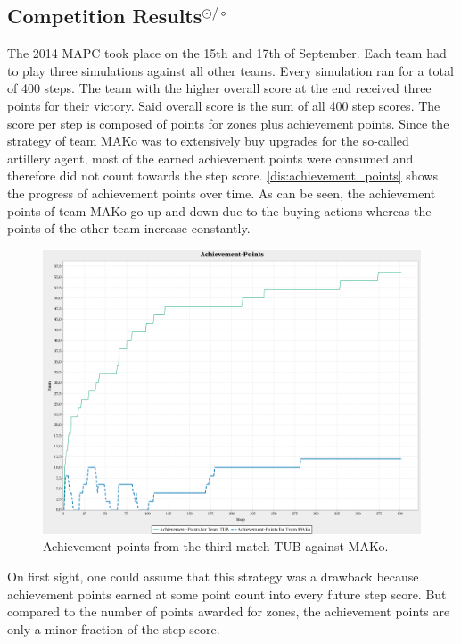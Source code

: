 \subsection[Competition Results]{Competition Results$^{\odot/\circ}$}
The 2014 MAPC took place on the 15th and 17th of September.
Each team had to play three simulations against all other teams.
Every simulation ran for a total of 400 steps.
The team with the higher overall score at the end received three points for their victory.
Said overall score is the sum of all 400 step scores.
The score per step is composed of points for zones plus achievement points.
Since the strategy of team MAKo was to extensively buy upgrades for the so-called artillery agent, most of the earned achievement points were consumed and therefore did not count towards the step score.
\autoref{dis:achievement_points} shows the progress of achievement points over time.
As can be seen, the achievement points of team MAKo go up and down due to the buying actions whereas the points of the other team increase constantly.
\begin{figure}[ht]
	\centering
	\includegraphics[width=\textwidth]{images/AchievementPoints.png}
  \caption{Achievement points from the third match TUB against MAKo.}
	\label{dis:achievement_points}
\end{figure}
On first sight, one could assume that this strategy was a drawback because achievement points earned at some point count into every future step score.
But compared to the number of points awarded for zones, the achievement points are only a minor fraction of the step score.
